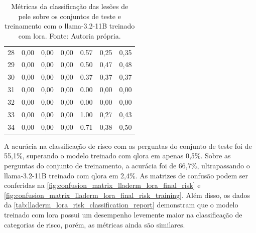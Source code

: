 \begin{table}[ht]
\begin{tabular}{l|c|c|c|c|c|c}
        28    & 0,00                                    & 0,00                                        & 0,00      &
        0.57  & 0,25                                    & 0,35                                                      \\
        29    & 0,00                                    & 0,00                                        & 0,00      &
        0.50  & 0,47                                    & 0,48                                                      \\
        30    & 0,00                                    & 0,00                                        & 0,00      &
        0.37  & 0,37                                    & 0,37                                                      \\
        31    & 0,00                                    & 0,00                                        & 0,00      &
        0.00  & 0,00                                    & 0,00                                                      \\
        32    & 0,00                                    & 0,00                                        & 0,00      &
        0.00  & 0,00                                    & 0,00                                                      \\
        33    & 0,00                                    & 0,00                                        & 0,00      &
        1.00  & 0,27                                    & 0,43                                                      \\
        34    & 0,00                                    & 0,00                                        & 0,00      &
        0.71  & 0,38                                    & 0,50                                                      \\
        \hline
    \end{tabular}
    \label{tab:lladerm_lora_skin_lesion_classification_report}
    \caption{Métricas da classificação das lesões de pele sobre os conjuntos de teste e treinamento com o
    \ac{llama}-3.2-11B treinado com \ac{lora}. Fonte: Autoria própria.}
\end{table}

\clearpage

A acurácia na classificação de risco com as perguntas do conjunto de teste foi de 55,1\%, superando o modelo treinado
com \ac{qlora} em apenas 0,5\%. Sobre as perguntas do conjunto de treinamento, a acurácia foi de 66,7\%, ultrapassando
o \ac{llama}-3.2-11B treinado com \ac{qlora} em 2,4\%. As matrizes de confusão podem ser conferidas na
\autoref{fig:confusion_matrix_lladerm_lora_final_risk} e
\autoref{fig:confusion_matrix_lladerm_lora_final_risk_training}. Além disso, os dados da
\autoref{tab:lladerm_lora_risk_classification_report} demonstram que o modelo treinado com \ac{lora} possui um
desempenho levemente maior na classificação de categorias de risco, porém, as métricas ainda são similares.

